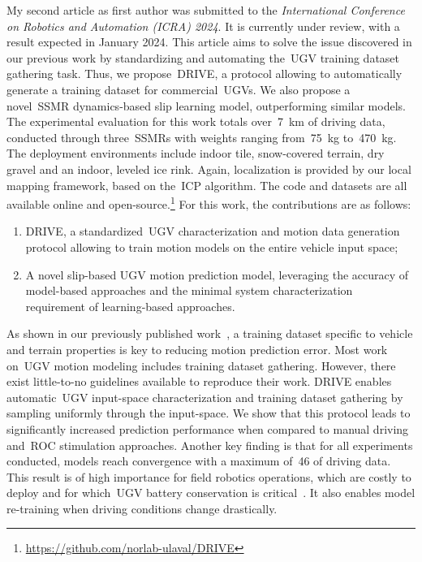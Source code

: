 \documentclass[12pt,letterpaper,oneside]{article}
\begin{document}
My second article as first author was submitted to the \emph{International Conference on Robotics and Automation (ICRA) 2024}.
It is currently under review, with a result expected in January 2024.
This article aims to solve the issue discovered in our previous work by standardizing and automating the~\ac{UGV} training dataset gathering task.
Thus, we propose~\ac{DRIVE}, a protocol allowing to automatically generate a training dataset for commercial~\acp{UGV}.
We also propose a novel~\ac{SSMR} dynamics-based slip learning model, outperforming similar models.
The experimental evaluation for this work totals over~\SI{7}{\kilo\meter} of driving data, conducted through three~\acp{SSMR} with weights ranging from~\SI{75}{\kilo\gram} to~\SI{470}{\kilo\gram}.
The deployment environments include indoor tile, snow-covered terrain, dry gravel and an indoor, leveled ice rink.
Again, localization is provided by our local mapping framework, based on the~\ac{ICP} algorithm.
The code and datasets are all available online and open-source.\footnote{\url{https://github.com/norlab-ulaval/DRIVE}}
For this work, the contributions are as follows:
\begin{enumerate}
	\item \ac{DRIVE}, a standardized~\ac{UGV} characterization and motion data generation protocol allowing to train motion models on the entire vehicle input space;
	\item A novel slip-based \ac{UGV} motion prediction model, leveraging the accuracy of model-based approaches and the minimal system characterization requirement of learning-based approaches.
\end{enumerate}
As shown in our previously published work~\citep{Baril2020}, a training dataset specific to vehicle and terrain properties is key to reducing motion prediction error.
Most work on~\ac{UGV} motion modeling includes training dataset gathering.
However, there exist little-to-no guidelines available to reproduce their work.
\ac{DRIVE} enables automatic~\ac{UGV} input-space characterization and training dataset gathering by sampling uniformly through the input-space.
We show that this protocol leads to significantly increased prediction performance when compared to manual driving and~\acf{ROC} stimulation approaches.
Another key finding is that for all experiments conducted, models reach convergence with a maximum of~\SI{46}{\sec} of driving data.
This result is of high importance for field robotics operations, which are costly to deploy and for which~\ac{UGV} battery conservation is critical~\citep{Baril2022}.
It also enables model re-training when driving conditions change drastically.
\end{document}
